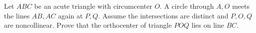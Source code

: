 Let $ABC$ be an acute triangle with circumcenter $O$. A circle through $A,O$ meets the lines $AB,AC$ again at $P,Q$. Assume the intersections are distinct and $P,O,Q$ are noncollinear. Prove that the orthocenter of triangle $POQ$ lies on line $BC$.
